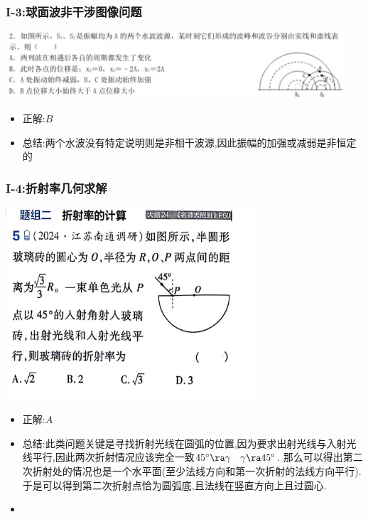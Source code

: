 \documentclass{article}
\begin{document}
\vspace{2em}

\subsubsection{I-3:球面波非干涉图像问题}
\includegraphics[width = 0.95\textwidth]{./pictures/2.1-6.png}

\begin{itemize}
    \item 正解:\quad $B$
    \item 总结:\quad 两个水波没有特定说明则是非相干波源,因此振幅的加强或减弱是非恒定的
\end{itemize}

\vspace{2em}

\subsubsection{I-4:折射率几何求解}
\includegraphics[width = 25em]{./pictures/2.1-9.png}

\begin{itemize}
    \item 正解:\quad $A$
    \item 总结:\quad 此类问题关键是寻找折射光线在圆弧的位置,因为要求出射光线与入射光线平行,因此两次折射情况应该完全一致$45^\circ \ra \gamma \quad \gamma \ra 45^\circ$.
          那么可以得出第二次折射处的情况也是一个水平面(至少法线方向和第一次折射的法线方向平行).于是可以得到第二次折射点恰为圆弧底,且法线在竖直方向上且过圆心.
    \item
\end{itemize}
\end{document}
